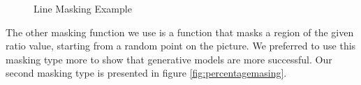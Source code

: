 \begin{figure}[!ht]
    \centering
        \hspace{0.02\columnwidth}
        \hspace{0.02\columnwidth}
    \vspace*{3mm}
    \caption{Line Masking Example}
    \label{fig:linemasking}
\end{figure}

The other masking function we use is a function that masks a region of the given ratio value, starting from a random point on the picture. We preferred to use this masking type more to show that generative models are more successful. Our second masking type is presented in figure \ref{fig:percentagemasing}.

